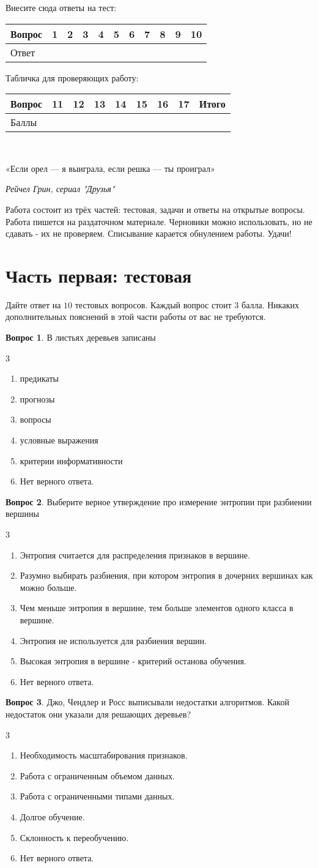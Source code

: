 \documentclass[12pt]{article}
\def \putyourname{\fbox{
    \begin{minipage}{42em}
      Фамилия, имя, номер группы:\vspace*{3ex}\par
      \noindent\dotfill\vspace{2mm}
    \end{minipage}
  }
}
\def \checktable{

  \vspace{5pt}
  Табличка для проверяющих работу:

\vspace{5pt}

  \begin{tabular}{|m{2cm}|m{1cm}|m{1cm}|m{1cm}|m{1cm}|m{1cm}|m{1cm}|m{1cm}|m{2cm}|}
\toprule
    Вопрос & 11 &  12 & 13 & 14 & 15 & 16 & 17 & Итого \\
\midrule
    Баллы &  &  & & & & & &  \\
 \bottomrule
\end{tabular}
}
\def \testtable{

\vspace{5pt}
  Внесите сюда ответы на тест:

\vspace{5pt}

\begin{tabular}{|m{2cm}|m{0.6cm}|m{0.6cm}|m{0.6cm}|m{0.6cm}|m{0.6cm}|m{0.6cm}|m{0.6cm}|m{0.6cm}|m{0.6cm}|m{0.6cm}|}
\toprule
    Вопрос & 1 &  2 & 3 & 4 & 5 & 6 & 7 & 8 & 9 & 10 \\
\midrule
    Ответ &  &  & & & & & & & & \\
 \bottomrule
\end{tabular}
}
\newenvironment{answerlist}[1][3]{
\begin{multicols}{#1}

\begin{enumerate}[label=\fbox{\emph{\Alph*}},ref=\emph{\alph*}]
}
{
\item Нет верного ответа.
\end{enumerate}
\end{multicols}
}
\theoremstyle{definition}
\newtheorem{question}{Вопрос}
\begin{document}
\putyourname

\testtable

\checktable

\mbox{ }

\epigraph{«Если орел — я выиграла, если решка — ты проиграл»
}{\textit{Рейчел Грин, сериал "Друзья"}}

Работа состоит из трёх частей: тестовая, задачи и ответы на открытые вопросы. Работа пишется на раздаточном материале. Черновики можно использовать, но не сдавать - их не проверяем.
Списывание карается обнулением работы. Удачи!

\section*{Часть первая: тестовая} 

Дайте ответ на $10$ тестовых вопросов. Каждый вопрос стоит $3$ балла. Никаких дополнительных пояснений в этой части работы от вас не требуются.
\begin{question}
В листьях деревьев записаны
\begin{answerlist}
  \item предикаты
  \item прогнозы
  \item вопросы
  \item условные выражения
  \item критерии информативности
\end{answerlist}
\end{question}

\begin{question}
Выберите верное утверждение про измерение энтропии при разбиении вершины
\begin{answerlist}
  \item Энтропия считается для распределения признаков в вершине.
  \item Разумно выбирать разбиения, при котором энтропия в дочерних вершинах как можно больше.
  \item Чем меньше энтропия в вершине, тем больше элементов одного класса в вершине.
  \item Энтропия не используется для разбиения вершин.
  \item Высокая энтропия в вершине - критерий останова обучения.
\end{answerlist}
\end{question}

\begin{question}
Джо, Чендлер и Росс выписывали недостатки алгоритмов. Какой недостаток они указали для решающих деревьев?
\begin{answerlist}
  \item Необходимость масштабирования признаков.
  \item Работа с ограниченным объемом данных.
  \item Работа с ограниченными типами данных.
  \item Долгое обучение.
  \item Склонность к переобучению.
\end{answerlist}
\end{question}
\end{document}
